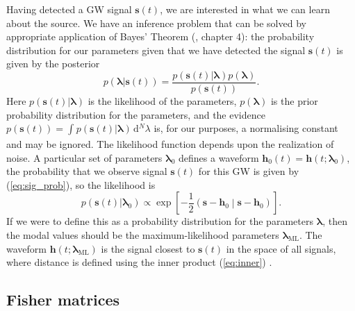\documentclass[useAMS,usedcolumn,usegraphicx,usenatbib]{mn2e}
\newcommand{\eqnref}[1]{(\ref{eq:#1})}
\newcommand{\sub}[1]{\ensuremath{_\mathrm{#1}}}
\newcommand{\dd}{\ensuremath{\mathrm{d}}}
\newcommand{\intd}[4]{\ensuremath{\int_{#1}^{#2}{#3}\,\dd{#4}}}
\newcommand{\recip}[1]{\ensuremath{\frac{1}{#1}}}
\newcommand{\innerprod}[2]{\ensuremath{\left({#1}\middle|{#2}\right)}}
\begin{document}
Having detected a GW signal $\boldsymbol{s}(t)$, we are interested in what we can learn about the source. We have an inference problem that can be solved by appropriate application of Bayes' Theorem (\citealt{Jaynes2003}, chapter 4): the probability distribution for our parameters given that we have detected the signal $\boldsymbol{s}(t)$ is given by the posterior
\begin{equation}
p(\boldsymbol{\lambda}|\boldsymbol{s}(t)) = \frac{p(\boldsymbol{s}(t)|\boldsymbol{\lambda})p(\boldsymbol{\lambda})}{p(\boldsymbol{s}(t))}.
\end{equation}
Here $p(\boldsymbol{s}(t)|\boldsymbol{\lambda})$ is the likelihood of the parameters, $p(\boldsymbol{\lambda})$ is the prior probability distribution for the parameters, and the evidence $p(\boldsymbol{s}(t)) = \intd{}{}{p(\boldsymbol{s}(t)|\boldsymbol{\lambda})}{^N \lambda}$ is, for our purposes, a normalising constant and may be ignored. The likelihood function depends upon the realization of noise. A particular set of parameters $\boldsymbol{\lambda}_0$ defines a waveform $\boldsymbol{h}_0(t) = \boldsymbol{h}(t; \boldsymbol{\lambda}_0)$, the probability that we observe signal $\boldsymbol{s}(t)$ for this GW is given by \eqnref{sig_prob}, so the likelihood is
\begin{equation}
p(\boldsymbol{s}(t)|\boldsymbol{\lambda}_0) \propto \exp\left[-\recip{2}\innerprod{\boldsymbol{s}-\boldsymbol{h}_0}{\boldsymbol{s}-\boldsymbol{h}_0}\right].
\label{eq:likelihood}
\end{equation}
If we were to define this as a probability distribution for the parameters $\boldsymbol{\lambda}$, then the modal values should be the maximum-likelihood parameters $\boldsymbol{\lambda}\sub{ML}$. The waveform $\boldsymbol{h}(t; \boldsymbol{\lambda}\sub{ML})$ is the signal closest to $\boldsymbol{s}(t)$ in the space of all signals, where distance is defined using the inner product \eqnref{inner} \citep{Cutler1994}.

\subsection{Fisher matrices}
\end{document}
